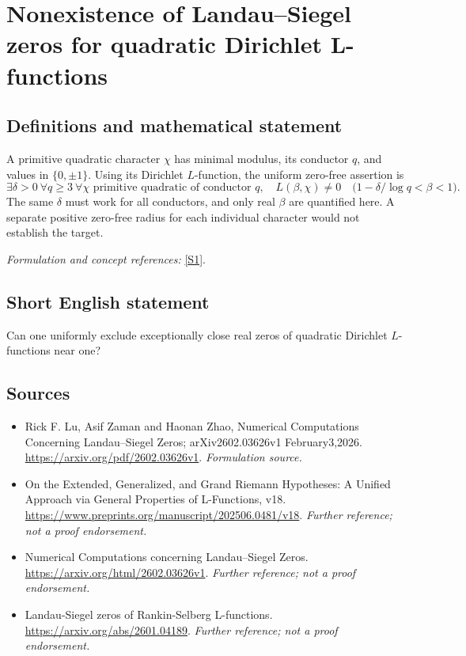 \documentclass[11pt]{article}
\begin{document}
\section*{\texorpdfstring{Nonexistence of Landau–Siegel zeros for quadratic Dirichlet L-functions}{Nonexistence of Landau–Siegel zeros for quadratic Dirichlet L-functions}}\label{43}
\subsection{Definitions and mathematical statement}
A primitive quadratic character $\chi$ has minimal modulus, its conductor $q$, and values in $\{0,\pm1\}$. Using its Dirichlet $L$-function, the uniform zero-free assertion is
\[
 \exists\delta>0\ \forall q\ge3\ \forall\chi\text{ primitive quadratic of conductor }q,
 \quad L(\beta,\chi)\ne0\quad\bigl(1-\delta/\log q<\beta<1\bigr).
\]
The same $\delta$ must work for all conductors, and only real $\beta$ are quantified here. A separate positive zero-free radius for each individual character would not establish the target.
\par\smallskip\textit{Formulation and concept references:} \href{https://arxiv.org/pdf/2602.03626v1}{[S1]}.

\subsection{Short English statement}
Can one uniformly exclude exceptionally close real zeros of quadratic Dirichlet $L$-functions near one?
\subsection{Sources}
\begin{itemize}
\item[S1]Rick F. Lu, Asif Zaman and Haonan Zhao, Numerical Computations Concerning Landau–Siegel Zeros; arXiv2602.03626v1 February3,2026.
\url{https://arxiv.org/pdf/2602.03626v1}.
\textit{Formulation source.}
\item[S2]On the Extended, Generalized, and Grand Riemann Hypotheses: A Unified Approach via General Properties of L-Functions, v18.
\url{https://www.preprints.org/manuscript/202506.0481/v18}.
\textit{Further reference; not a proof endorsement.}
\item[S3]Numerical Computations concerning Landau–Siegel Zeros.
\url{https://arxiv.org/html/2602.03626v1}.
\textit{Further reference; not a proof endorsement.}
\item[S4]Landau-Siegel zeros of Rankin-Selberg L-functions.
\url{https://arxiv.org/abs/2601.04189}.
\textit{Further reference; not a proof endorsement.}
\end{itemize}
\end{document}
